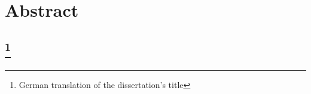 \cleardoublepage

\chapter{Abstract}

\section*{\mytitle}

\section*{\mytitlede\footnote{German translation of the dissertation's title}}
\begin{otherlanguage}{ngerman}
\end{otherlanguage}

\cleardoublepage

